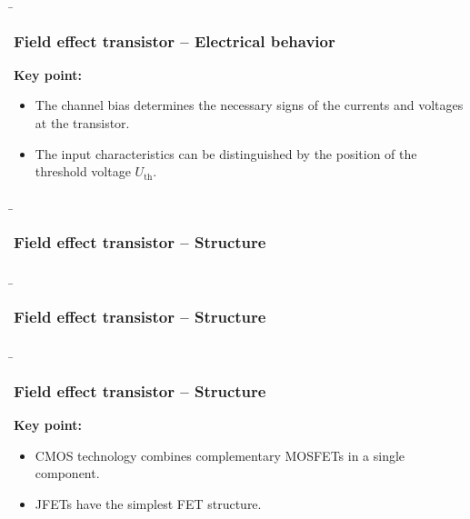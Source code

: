 \begin{frame}
    \b{\frametitle{Field effect transistor -- Electrical behavior}
        \textbf{Key point:}
        \begin{itemize}
            \item The channel bias determines the necessary signs of the currents and voltages at the transistor.
            \item The input characteristics can be distinguished by the position of the threshold voltage $U_\mathrm{th}$.
        \end{itemize}
        }
\end{frame}

\begin{frame}
    \b{ \frametitle{Field effect transistor -- Structure}
        \begin{figure}[H]
            \centering
            
        \end{figure}
    }
\end{frame}

\begin{frame}
    \b{ \frametitle{Field effect transistor -- Structure}
        \begin{figure}[H]
            \centering
            
        \end{figure}
    }
\end{frame}

\begin{frame}
    \b{\frametitle{Field effect transistor -- Structure}
        \textbf{Key point:}
        \begin{itemize}
            \item CMOS technology combines complementary MOSFETs in a single component.
            \item JFETs have the simplest FET structure.
        \end{itemize}
        }
\end{frame}

